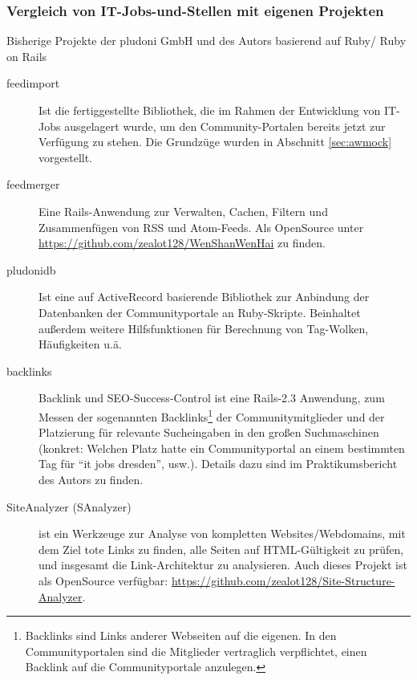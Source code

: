 \subsubsection{Vergleich von IT-Jobs-und-Stellen mit eigenen Projekten}

Bisherige Projekte der pludoni GmbH und des Autors basierend auf Ruby/ Ruby on Rails
\begin{description}
 \item[feedimport] Ist die fertiggestellte Bibliothek, die im Rahmen der Entwicklung von IT-Jobs ausgelagert wurde, um den Community-Portalen bereits jetzt zur Verfügung zu stehen. Die Grundzüge wurden in Abschnitt \ref{sec:awmock} vorgestellt.
 \item[feedmerger] Eine Rails-Anwendung zur Verwalten, Cachen, Filtern und Zusammenfügen von RSS und Atom-Feeds. Als OpenSource unter \url{https://github.com/zealot128/WenShanWenHai} zu finden.
 \item[pludonidb] Ist eine auf ActiveRecord basierende Bibliothek zur Anbindung der Datenbanken der Communityportale an Ruby-Skripte. Beinhaltet außerdem weitere Hilfsfunktionen für Berechnung von Tag-Wolken, Häufigkeiten u.ä.
 \item[backlinks] Backlink und SEO-Success-Control ist eine Rails-2.3 Anwendung, zum Messen der sogenannten Backlinks\footnote{Backlinks sind Links anderer Webseiten auf die eigenen. In den Communityportalen sind die Mitglieder vertraglich verpflichtet, einen Backlink auf die Communityportale anzulegen.} der Communitymitglieder und der Platzierung für relevante Sucheingaben in den großen Suchmaschinen (konkret: Welchen Platz hatte ein Communityportal an einem bestimmten Tag für "`it jobs dresden"', usw.). Details dazu sind im Praktikumsbericht des Autors zu finden. %
 
 \item[SiteAnalyzer (SAnalyzer)] ist ein Werkzeuge zur Analyse von kompletten Websites/Webdomains, mit dem Ziel tote Links zu finden, alle Seiten auf HTML-Gültigkeit zu prüfen, und insgesamt die Link-Architektur zu analysieren. Auch dieses Projekt ist als OpenSource verfügbar: \url{https://github.com/zealot128/Site-Structure-Analyzer}.
\end{description}


